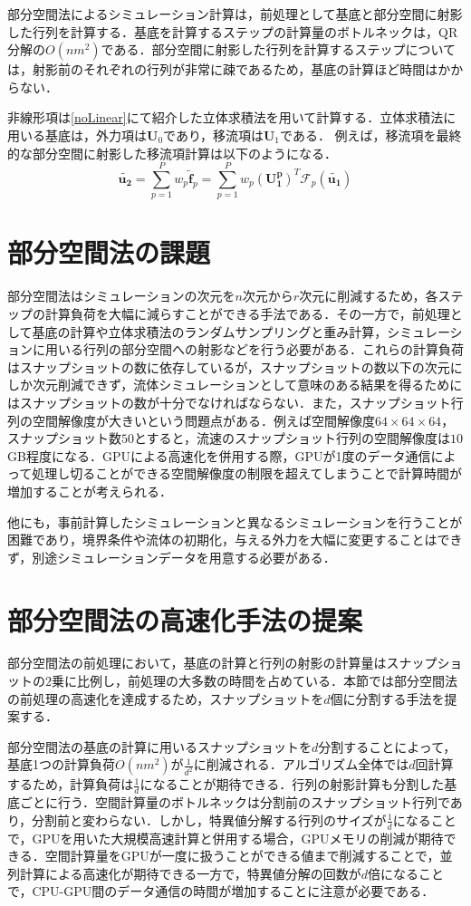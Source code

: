 \documentclass[a4j,12pt]{jreport}
\begin{document}
部分空間法によるシミュレーション計算は，前処理として基底と部分空間に射影した行列を計算する．基底を計算するステップの計算量のボトルネックは，QR分解の$O(nm^2)$である．部分空間に射影した行列を計算するステップについては，射影前のそれぞれの行列が非常に疎であるため，基底の計算ほど時間はかからない．

非線形項は\ref{noLinear}にて紹介した立体求積法を用いて計算する．立体求積法に用いる基底は，外力項は$\bm{U}_0$であり，移流項は$\bm{U}_1$である．
例えば，移流項を最終的な部分空間に射影した移流項計算は以下のようになる．
\[
	\bm{\tilde{u_2}} = \sum_{p=1}^Pw_p\bm{\tilde{f}}_p =   \sum_{p=1}^Pw_p(\bm{U^p_1})^T\mathcal{F}_p(\bm{\tilde{u_1}})
\]

\section{部分空間法の課題}
部分空間法はシミュレーションの次元を$n$次元から$r$次元に削減するため，各ステップの計算負荷を大幅に減らすことができる手法である．その一方で，前処理として基底の計算や立体求積法のランダムサンプリングと重み計算，シミュレーションに用いる行列の部分空間への射影などを行う必要がある．これらの計算負荷はスナップショットの数に依存しているが，スナップショットの数以下の次元にしか次元削減できず，流体シミュレーションとして意味のある結果を得るためにはスナップショットの数が十分でなければならない．また，スナップショット行列の空間解像度が大きいという問題点がある．例えば空間解像度$64\times64\times64$，スナップショット数$50$とすると，流速のスナップショット行列の空間解像度は$10$GB程度になる．GPUによる高速化を併用する際，GPUが1度のデータ通信によって処理し切ることができる空間解像度の制限を超えてしまうことで計算時間が増加することが考えられる．

他にも，事前計算したシミュレーションと異なるシミュレーションを行うことが困難であり，境界条件や流体の初期化，与える外力を大幅に変更することはできず，別途シミュレーションデータを用意する必要がある．

\section{部分空間法の高速化手法の提案}
部分空間法の前処理において，基底の計算と行列の射影の計算量はスナップショットの$2$乗に比例し，前処理の大多数の時間を占めている．本節では部分空間法の前処理の高速化を達成するため，スナップショットを$d$個に分割する手法を提案する．

部分空間法の基底の計算に用いるスナップショットを$d$分割することによって，基底1つの計算負荷$O(nm^2)$が$\frac{1}{d^2}$に削減される．アルゴリズム全体では$d$回計算するため，計算負荷は$\frac{1}{d}$になることが期待できる．行列の射影計算も分割した基底ごとに行う．空間計算量のボトルネックは分割前のスナップショット行列であり，分割前と変わらない．しかし，特異値分解する行列のサイズが$\frac{1}{d}$になることで，GPUを用いた大規模高速計算と併用する場合，GPUメモリの削減が期待できる．空間計算量をGPUが一度に扱うことができる値まで削減することで，並列計算による高速化が期待できる一方で，特異値分解の回数が$d$倍になることで，CPU-GPU間のデータ通信の時間が増加することに注意が必要である．
\end{document}
